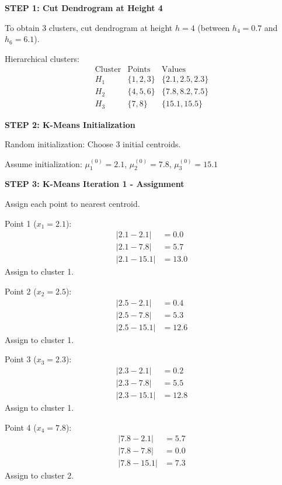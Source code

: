 \documentclass[12pt]{article}
\begin{document}
\begin{solution}

\textbf{STEP 1: Cut Dendrogram at Height 4}

To obtain 3 clusters, cut dendrogram at height $h = 4$ (between $h_4 = 0.7$ and $h_6 = 6.1$).

Hierarchical clusters:
\[
\boxed{
\begin{array}{c|c|c}
\text{Cluster} & \text{Points} & \text{Values} \\
\hline
H_1 & \{1, 2, 3\} & \{2.1, 2.5, 2.3\} \\
H_2 & \{4, 5, 6\} & \{7.8, 8.2, 7.5\} \\
H_3 & \{7, 8\} & \{15.1, 15.5\}
\end{array}
}
\]

\textbf{STEP 2: K-Means Initialization}

Random initialization: Choose 3 initial centroids.

Assume initialization: $\mu_1^{(0)} = 2.1$, $\mu_2^{(0)} = 7.8$, $\mu_3^{(0)} = 15.1$

\textbf{STEP 3: K-Means Iteration 1 - Assignment}

Assign each point to nearest centroid.

Point 1 ($x_1 = 2.1$):
\begin{align*}
|2.1 - 2.1| &= 0.0 \\
|2.1 - 7.8| &= 5.7 \\
|2.1 - 15.1| &= 13.0
\end{align*}
Assign to cluster 1.

Point 2 ($x_2 = 2.5$):
\begin{align*}
|2.5 - 2.1| &= 0.4 \\
|2.5 - 7.8| &= 5.3 \\
|2.5 - 15.1| &= 12.6
\end{align*}
Assign to cluster 1.

Point 3 ($x_3 = 2.3$):
\begin{align*}
|2.3 - 2.1| &= 0.2 \\
|2.3 - 7.8| &= 5.5 \\
|2.3 - 15.1| &= 12.8
\end{align*}
Assign to cluster 1.

Point 4 ($x_4 = 7.8$):
\begin{align*}
|7.8 - 2.1| &= 5.7 \\
|7.8 - 7.8| &= 0.0 \\
|7.8 - 15.1| &= 7.3
\end{align*}
Assign to cluster 2.


\end{solution}
\end{document}
